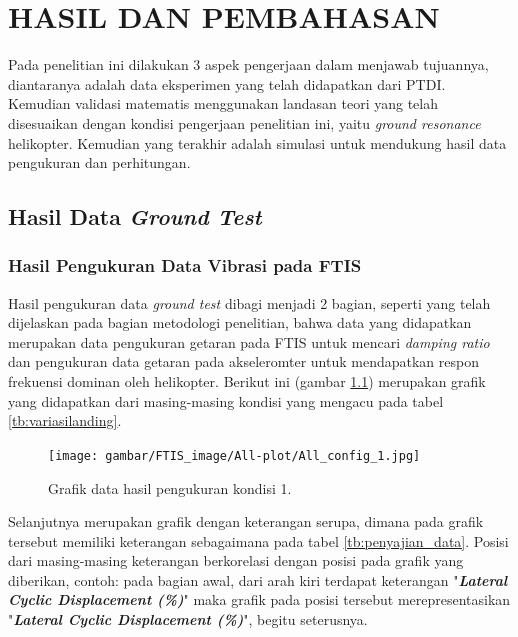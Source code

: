 \chapter{HASIL DAN PEMBAHASAN}
\label{chap:hasil dan pembahasan}

\thispagestyle{newchap}
Pada penelitian ini dilakukan 3 aspek pengerjaan dalam menjawab tujuannya, diantaranya adalah data eksperimen yang telah didapatkan dari PTDI. Kemudian validasi matematis menggunakan landasan teori yang telah disesuaikan dengan kondisi pengerjaan penelitian ini, yaitu \textit{ground resonance} helikopter. Kemudian yang terakhir adalah simulasi untuk mendukung hasil data pengukuran dan perhitungan. 

\section{Hasil Data \textit{Ground Test}}

\subsection{Hasil Pengukuran Data Vibrasi pada FTIS}

Hasil pengukuran data \textit{ground test} dibagi menjadi 2 bagian, seperti yang telah dijelaskan pada bagian metodologi penelitian, bahwa data yang didapatkan merupakan data pengukuran getaran pada FTIS untuk mencari \textit{damping ratio} dan pengukuran data getaran pada akseleromter untuk mendapatkan respon frekuensi dominan oleh helikopter. Berikut ini (gambar \ref{fig:condition_1}) merupakan grafik yang didapatkan dari masing-masing kondisi yang mengacu pada tabel \ref{tb:variasilanding}.

\begin{figure}[H]
	\centering
	\texttt{[image: gambar/FTIS\_image/All-plot/All\_config\_1.jpg]}
	\caption{Grafik data hasil pengukuran kondisi 1.}
	\label{fig:condition_1}
\end{figure}

Selanjutnya merupakan grafik dengan keterangan serupa, dimana pada grafik tersebut memiliki keterangan sebagaimana pada tabel \ref{tb:penyajian_data}. Posisi dari masing-masing keterangan berkorelasi dengan posisi pada grafik yang diberikan, contoh: pada bagian awal, dari arah kiri terdapat keterangan "\textbf{\textit{Lateral Cyclic Displacement (\%)}}" maka grafik pada posisi tersebut merepresentasikan "\textbf{\textit{Lateral Cyclic Displacement (\%)}}", begitu seterusnya.

